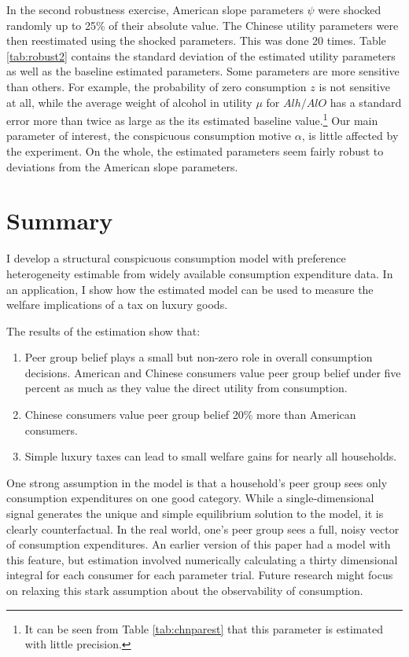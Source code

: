 \documentclass[11pt]{article}
\begin{document}
\begin{CJK}{UTF8}{gbsn}
In the second robustness exercise, American slope parameters $\psi$ were shocked randomly up to 25\% of their absolute value.  The Chinese utility parameters were then reestimated using the shocked parameters.  This was done 20 times.  Table \ref{tab:robust2} contains the standard deviation of the estimated utility parameters as well as the baseline estimated parameters.  Some parameters are more sensitive than others.  For example, the probability of zero consumption $z$ is not sensitive at all, while the average weight of alcohol in utility $\mu$ for $Alh / AlO$ has a standard error more than twice as large as the its estimated baseline value.\footnote{It can be seen from Table \ref{tab:chnparest} that this parameter is estimated with little precision.}  Our main parameter of interest, the conspicuous consumption motive $\alpha$, is little affected by the experiment.  On the whole, the estimated parameters seem fairly robust to deviations from the American slope parameters.

\section{Summary}
I develop a structural conspicuous consumption model with preference heterogeneity estimable from widely available consumption expenditure data.  In an application, I show how the estimated model can be used to measure the welfare implications of a tax on luxury goods.

The results of the estimation show that:
\begin{enumerate}
    \item Peer group belief plays a small but non-zero role in overall consumption decisions.  American and Chinese consumers value peer group belief under five percent as much as they value the direct utility from consumption.
    \item Chinese consumers value peer group belief 20\% more than American consumers.
    \item Simple luxury taxes can lead to small welfare gains for nearly all households.
\end{enumerate}

One strong assumption in the model is that a household's peer group sees only consumption expenditures on one good category.  While a single-dimensional signal generates the unique and simple equilibrium solution to the model, it is clearly counterfactual.  In the real world, one's peer group sees a full, noisy vector of consumption expenditures.  An earlier version of this paper had a model with this feature, but estimation involved numerically calculating a thirty dimensional integral for each consumer for each parameter trial.  Future research might focus on relaxing this stark assumption about the observability of consumption.


\end{CJK}
\end{document}
